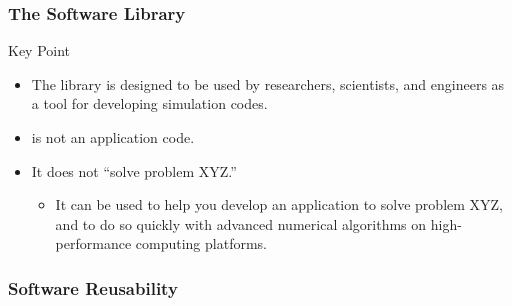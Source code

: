  

\frame
{
  \frametitle{The \libmesh{} Software Library}

  \begin{block}{Key Point}
    \begin{itemize}
      \item The \libmesh{} library is designed to be used by researchers, scientists, and engineers \textcolor{nasablue}{as a tool for developing simulation codes}.
      \item \libMesh{} is not an application code.
      \item It does not ``solve problem XYZ.''
        \begin{itemize}
          \item It can be used to help you develop an application to solve problem XYZ, and to do so quickly with advanced numerical algorithms on high-performance computing platforms.
        \end{itemize}
    \end{itemize}    
  \end{block}
} 



\frame
{
  \frametitle{Software Reusability}
}

 






